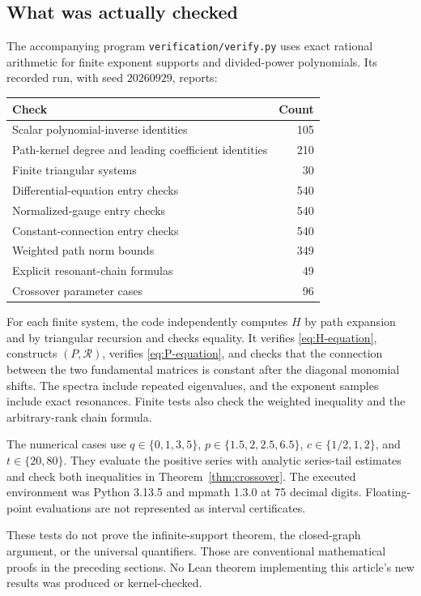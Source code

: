 \documentclass[11pt,a4paper]{article}
\numberwithin{equation}{section}
\theoremstyle{definition}
\theoremstyle{remark}
\begin{document}
\subsection{What was actually checked}
The accompanying program \texttt{verification/verify.py} uses exact
rational arithmetic for finite exponent supports and divided-power
polynomials. Its recorded run, with seed $20260929$, reports:
\begin{center}
\begin{tabular}{@{}lr@{}}
\toprule
Check & Count\\
\midrule
Scalar polynomial-inverse identities &105\\
Path-kernel degree and leading coefficient identities &210\\
Finite triangular systems &30\\
Differential-equation entry checks &540\\
Normalized-gauge entry checks &540\\
Constant-connection entry checks &540\\
Weighted path norm bounds &349\\
Explicit resonant-chain formulas &49\\
Crossover parameter cases &96\\
\bottomrule
\end{tabular}
\end{center}

For each finite system, the code independently computes $H$ by path
expansion and by triangular recursion and checks equality. It verifies
\eqref{eq:H-equation}, constructs $(P,\mathcal R)$, verifies
\eqref{eq:P-equation}, and checks that the connection between the two
fundamental matrices is constant after the diagonal monomial shifts.
The spectra include repeated eigenvalues, and the exponent samples include
exact resonances. Finite tests also check the weighted inequality and the
arbitrary-rank chain formula.

The numerical cases use $q\in\{0,1,3,5\}$,
$p\in\{1.5,2,2.5,6.5\}$, $c\in\{1/2,1,2\}$, and $t\in\{20,80\}$.
They evaluate the positive series with analytic series-tail estimates and
check both inequalities in Theorem~\ref{thm:crossover}. The executed
environment was Python 3.13.5 and mpmath 1.3.0 at 75 decimal digits.
Floating-point evaluations are not represented as interval certificates.

These tests do not prove the infinite-support theorem, the closed-graph
argument, or the universal quantifiers. Those are conventional mathematical
proofs in the preceding sections. No Lean theorem implementing this
article's new results was produced or kernel-checked.
\end{document}
